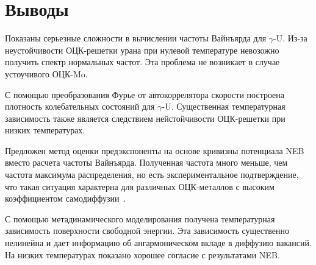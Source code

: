 \documentclass[master,14pt,subf,href,colorlinks=true
]{disser}
\begin{document}
\section{Выводы}
Показаны серьезные сложности в вычислении частоты Вайнъярда для $\gamma$-U. Из-за неустойчивости ОЦК-решетки урана при нулевой температуре невозожно получить спектр нормальных частот. Эта проблема не возникает в случае устоучивого ОЦК-Mo.

С помощью преобразования Фурье от автокоррелятора скорости построена плотность колебательных состояний для $\gamma$-U. Существенная температурная зависимость также является следствием нейстойчивости ОЦК-решетки при низких температурах.

Предложен метод оценки предэкспоненты на основе кривизны потенциала NEB вместо расчета частоты Вайнъярда. Полученная частота много меньше, чем частота максимума распределения, но есть экспериментальное подтверждение, что такая ситуация характерна для различных ОЦК-металлов с высоким коэффициентом самодиффузии~\cite{BCC_Soft_Phonons}.

С помощью метадинамического моделирования получена температурная зависимость поверхности свободной энергии. Эта зависимость существенно нелинейна и дает информацию об ангармоническом вкладе в диффузию вакансий. На низких температурах показано хорошее согласие с результатами NEB.
\end{document}
